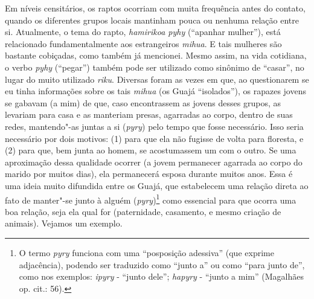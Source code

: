 Em níveis censitários, os raptos ocorriam com muita frequência antes do
contato, quando os diferentes grupos locais mantinham pouca ou nenhuma
relação entre si. Atualmente, o tema do rapto, \emph{hamirikoa pyhy}
(``apanhar mulher''), está relacionado fundamentalmente aos estrangeiros
\emph{mihua}. E tais mulheres são bastante cobiçadas, como também já
mencionei. Mesmo assim, na vida cotidiana, o verbo \emph{pyhy} (``pegar'')
também pode ser utilizado como sinônimo de ``casar'', no lugar do muito
utilizado \emph{riku}. Diversas foram as vezes em que, ao questionarem
se eu tinha informações sobre os tais \emph{mihua} (os Guajá
``isolados''), os rapazes jovens se gabavam (a mim) de que, caso
encontrassem as jovens desses grupos, as levariam para casa e as
manteriam presas, agarradas ao corpo, dentro de suas redes, mantendo"-as
juntas a si (\emph{pyry}) pelo tempo que fosse necessário. Isso seria
necessário por dois motivos: (1) para que ela não fugisse de volta para
floresta, e (2) para que, bem junta ao homem, se acostumassem um com o
outro. Se uma aproximação dessa qualidade ocorrer (a jovem permanecer
agarrada ao corpo do marido por muitos dias), ela permanecerá esposa
durante muitos anos. Essa é uma ideia muito difundida entre os Guajá,
que estabelecem uma relação direta ao fato de manter"-se junto à alguém
(\emph{pyry})\footnote{O termo \emph{pyry} funciona com uma ``posposição
  adessiva'' (que exprime adjacência), podendo ser traduzido como ``junto
  a'' ou como ``para junto de'', como nos exemplos: \emph{ipyry} - ``junto
  dele''; \emph{hapyry} - ``junto a mim'' (Magalhães op. cit.: 56).} como
essencial para que ocorra uma boa relação, seja ela qual for
(paternidade, casamento, e mesmo criação de animais). Vejamos um
exemplo.

